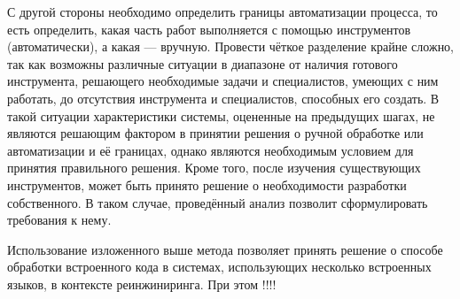 \begin{enumerate}
  С другой стороны необходимо определить границы автоматизации процесса, то есть определить, какая часть работ выполняется с помощью инструментов (автоматически), а какая --- вручную. Провести чёткое разделение крайне сложно, так как возможны различные ситуации в диапазоне от наличия готового инструмента, решающего необходимые задачи и специалистов, умеющих с ним работать, до отсутствия инструмента и специалистов, способных его создать. В такой ситуации характеристики системы, оцененные на предыдущих шагах, не являются решающим фактором в принятии решения о ручной обработке или автоматизации и её границах, однако являются необходимым условием для принятия правильного решения.
  Кроме того, после изучения существующих инструментов, может быть  принято решение о необходимости разработки собственного. В таком случае, проведённый анализ позволит сформулировать требования к нему.
  
\end{enumerate}

Использование изложенного выше метода позволяет принять решение о способе обработки встроенного кода в системах, использующих несколько встроенных языков, в контексте реинжиниринга. При этом !!!!  


\clearpage
